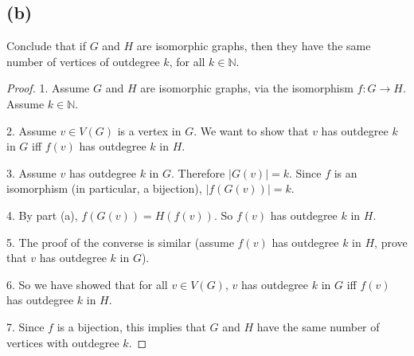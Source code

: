 \documentclass[14pt]{extarticle}
\begin{document}
\subsection{(b)}
Conclude that if $G$ and $H$ are isomorphic graphs, then they have the same number of vertices of outdegree $k$, for all $k \in \mathbb{N}$.
\begin{proof}
1. Assume $G$ and $H$ are isomorphic graphs, via the isomorphism $f: G \to H$. Assume $k \in \mathbb{N}$.

2. Assume $v \in V(G)$ is a vertex in $G$. We want to show that $v$ has outdegree $k$ in $G$ iff $f(v)$ has outdegree $k$ in $H$.

3. Assume $v$ has outdegree $k$ in $G$. Therefore $|G(v)| = k$. Since $f$ is an isomorphism (in particular, a bijection), $|f(G(v))| = k$.

4. By part (a), $f(G(v)) = H(f(v))$. So $f(v)$ has outdegree $k$ in $H$.

5. The proof of the converse is similar (assume $f(v)$ has outdegree $k$ in $H$, prove that $v$ has outdegree $k$ in $G$).

6. So we have showed that for all $v \in V(G)$, $v$ has outdegree $k$ in $G$ iff $f(v)$ has outdegree $k$ in $H$. 

7. Since $f$ is a bijection, this implies that $G$ and $H$ have the same number of vertices with outdegree $k$. 
\end{proof}
\end{document}
